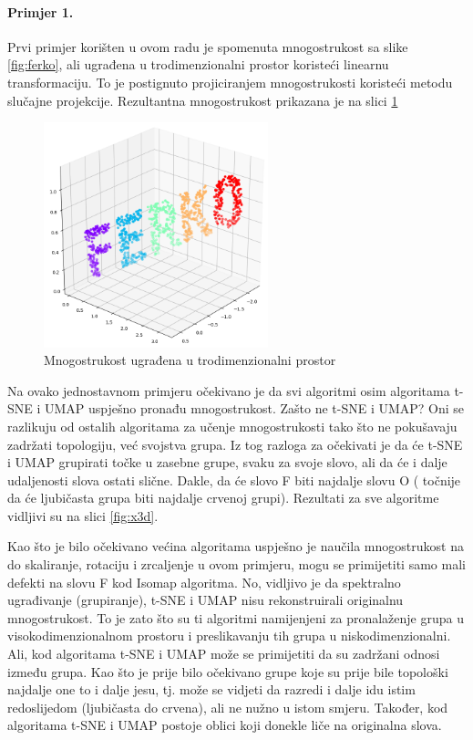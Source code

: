 \documentclass[times, utf8, diplomski]{fer}
\begin{document}
\paragraph{Primjer 1.}
Prvi primjer korišten u ovom radu je spomenuta mnogostrukost sa slike \ref{fig:ferko}, ali ugrađena u trodimenzionalni prostor koristeći linearnu transformaciju. To je postignuto projiciranjem mnogostrukosti koristeći metodu slučajne projekcije. Rezultantna mnogostrukost prikazana je na slici \ref{fig:ferko3d}

\begin{figure}[htb]
    \centering
    \includegraphics[width=6.5cm]{resources/images/reduction/compare/ferko3d.png}
    \caption{Mnogostrukost ugrađena u trodimenzionalni prostor}
    \label{fig:ferko3d}
\end{figure}

Na ovako jednostavnom primjeru očekivano je da svi algoritmi osim algoritama t-SNE i UMAP uspješno pronađu mnogostrukost. Zašto ne t-SNE i UMAP? Oni se razlikuju od ostalih algoritama za učenje mnogostrukosti tako što ne pokušavaju zadržati topologiju, već svojstva grupa. Iz tog razloga za očekivati je da će t-SNE i UMAP grupirati točke u zasebne grupe, svaku za svoje slovo, ali da će i dalje udaljenosti slova ostati slične. Dakle, da će slovo F biti najdalje slovu O ( točnije da će ljubičasta grupa biti najdalje crvenoj grupi). Rezultati za sve algoritme vidljivi su na slici \ref{fig:x3d}.

Kao što je bilo očekivano većina algoritama uspješno je naučila mnogostrukost na do skaliranje, rotaciju i zrcaljenje u ovom primjeru, mogu se primijetiti samo mali defekti na slovu F kod Isomap algoritma. No, vidljivo je da spektralno ugrađivanje (grupiranje), t-SNE i UMAP nisu rekonstruirali originalnu mnogostrukost. To je zato što su ti algoritmi namijenjeni za pronalaženje grupa u visokodimenzionalnom prostoru i preslikavanju tih grupa u niskodimenzionalni. Ali, kod algoritama t-SNE i UMAP može se primijetiti da su zadržani odnosi između grupa. Kao što je prije bilo očekivano grupe koje su prije bile topološki najdalje one to i dalje jesu, tj. može se vidjeti da razredi i dalje idu istim redoslijedom (ljubičasta do crvena), ali ne nužno u istom smjeru. Također, kod algoritama t-SNE i UMAP postoje oblici koji donekle liče na originalna slova.
\end{document}
